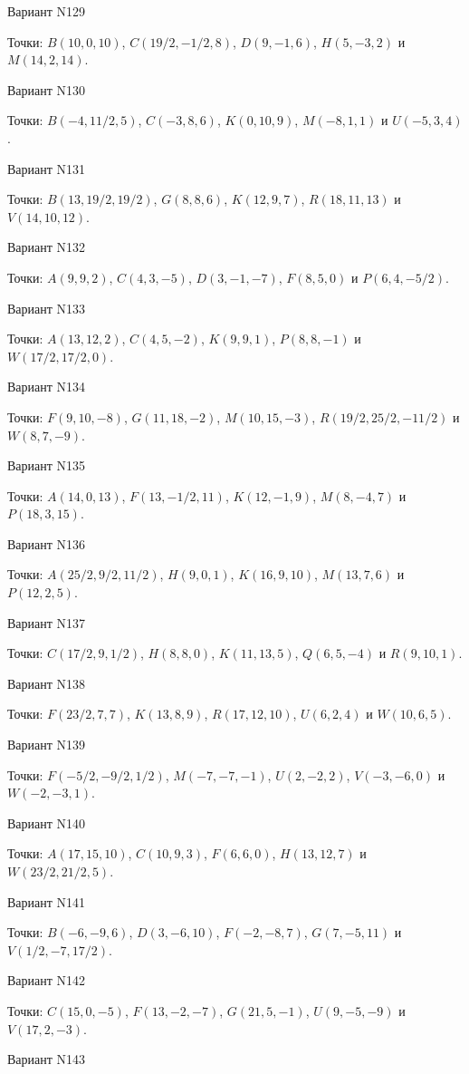 \documentclass[11pt]{report}
\begin{document}
Вариант N129

Точки: $B(10, 0, 10)$, $C(19/2, -1/2, 8)$, $D(9, -1, 6)$, $H(5, -3, 2)$ и $M(14, 2, 14)$.

Вариант N130

Точки: $B(-4, 11/2, 5)$, $C(-3, 8, 6)$, $K(0, 10, 9)$, $M(-8, 1, 1)$ и $U(-5, 3, 4)$.

Вариант N131

Точки: $B(13, 19/2, 19/2)$, $G(8, 8, 6)$, $K(12, 9, 7)$, $R(18, 11, 13)$ и $V(14, 10, 12)$.

Вариант N132

Точки: $A(9, 9, 2)$, $C(4, 3, -5)$, $D(3, -1, -7)$, $F(8, 5, 0)$ и $P(6, 4, -5/2)$.

Вариант N133

Точки: $A(13, 12, 2)$, $C(4, 5, -2)$, $K(9, 9, 1)$, $P(8, 8, -1)$ и $W(17/2, 17/2, 0)$.

Вариант N134

Точки: $F(9, 10, -8)$, $G(11, 18, -2)$, $M(10, 15, -3)$, $R(19/2, 25/2, -11/2)$ и $W(8, 7, -9)$.

Вариант N135

Точки: $A(14, 0, 13)$, $F(13, -1/2, 11)$, $K(12, -1, 9)$, $M(8, -4, 7)$ и $P(18, 3, 15)$.

Вариант N136

Точки: $A(25/2, 9/2, 11/2)$, $H(9, 0, 1)$, $K(16, 9, 10)$, $M(13, 7, 6)$ и $P(12, 2, 5)$.

Вариант N137

Точки: $C(17/2, 9, 1/2)$, $H(8, 8, 0)$, $K(11, 13, 5)$, $Q(6, 5, -4)$ и $R(9, 10, 1)$.

Вариант N138

Точки: $F(23/2, 7, 7)$, $K(13, 8, 9)$, $R(17, 12, 10)$, $U(6, 2, 4)$ и $W(10, 6, 5)$.

Вариант N139

Точки: $F(-5/2, -9/2, 1/2)$, $M(-7, -7, -1)$, $U(2, -2, 2)$, $V(-3, -6, 0)$ и $W(-2, -3, 1)$.

Вариант N140

Точки: $A(17, 15, 10)$, $C(10, 9, 3)$, $F(6, 6, 0)$, $H(13, 12, 7)$ и $W(23/2, 21/2, 5)$.

Вариант N141

Точки: $B(-6, -9, 6)$, $D(3, -6, 10)$, $F(-2, -8, 7)$, $G(7, -5, 11)$ и $V(1/2, -7, 17/2)$.

Вариант N142

Точки: $C(15, 0, -5)$, $F(13, -2, -7)$, $G(21, 5, -1)$, $U(9, -5, -9)$ и $V(17, 2, -3)$.

Вариант N143
\end{document}
